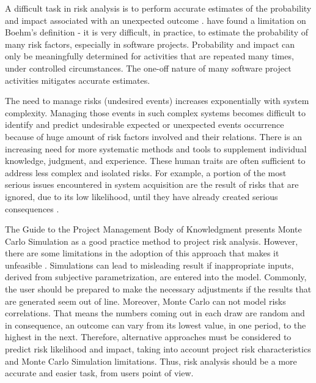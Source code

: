 \documentclass[a4paper,twoside]{article}
\begin{document}
A difficult task in risk analysis is to perform accurate estimates of the probability and impact associated with an unexpected outcome \cite{BOEHM1991}. \cite{bannerman2008risk} have found a limitation on Boehm's definition - it is very difficult, in practice, to estimate the probability of many risk factors, especially in software projects. Probability and impact can only be meaningfully determined for activities that are repeated many times, under controlled circumstances. The one-off nature of many software project activities mitigates accurate estimates.

The need to manage risks (undesired events) increases exponentially with system complexity. Managing those events in such complex systems becomes difficult to identify and predict undesirable expected or unexpected events occurrence because of huge amount of risk factors involved and their relations. There is an increasing need for more systematic methods and tools to supplement individual knowledge, judgment, and experience. These human traits are often sufficient to address less complex and isolated risks. For example, a portion of the most serious issues encountered in system acquisition are the result of risks that are ignored, due to its low likelihood, until they have already created serious consequences \cite{higuera1996software}.

The Guide to the Project Management Body of Knowledgment \cite{PMBOK2008} presents Monte Carlo Simulation as a good practice method to project risk analysis. However, there are some limitations in the adoption of this approach that makes it unfeasible \cite{Ibbotson2005}. Simulations can lead to misleading result if inappropriate inputs, derived from subjective parametrization, are entered into the model. Commonly, the user should be prepared to make the necessary adjustments if the results that are generated seem out of line. Moreover, Monte Carlo can not model risks correlations. That means the numbers coming out in each draw are random and in consequence, an outcome can vary from its lowest value, in one period, to the highest in the next. Therefore, alternative approaches must be considered to predict risk likelihood and impact, taking into account project risk characteristics and Monte Carlo Simulation limitations. Thus, risk analysis should be a more accurate and easier task, from users point of view.
\end{document}
